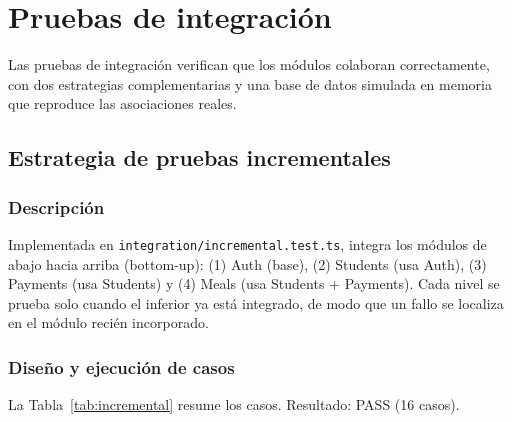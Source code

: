 \documentclass[stu,11pt,floatsintext]{apa7}
\begin{document}
\section{Pruebas de integración}
Las pruebas de integración verifican que los módulos colaboran correctamente, con dos
estrategias complementarias y una base de datos simulada en memoria que reproduce las
asociaciones reales.

\subsection{Estrategia de pruebas incrementales}

\subsubsection{Descripción}
Implementada en \texttt{integration/incremental.test.ts}, integra los módulos de abajo
hacia arriba (bottom-up): (1) Auth (base), (2) Students (usa Auth), (3) Payments (usa
Students) y (4) Meals (usa Students + Payments). Cada nivel se prueba solo cuando el
inferior ya está integrado, de modo que un fallo se localiza en el módulo recién
incorporado.

\subsubsection{Diseño y ejecución de casos}
La Tabla~\ref{tab:incremental} resume los casos. Resultado: PASS (16 casos).
\end{document}
